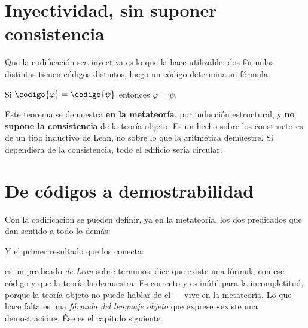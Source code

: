 \section{Inyectividad, sin suponer consistencia}

Que la codificación sea inyectiva es lo que la hace utilizable: dos fórmulas distintas tienen
códigos distintos, luego un código determina su fórmula.

\begin{teorema}
Si \(\codigo{\varphi} = \codigo{\psi}\) entonces \(\varphi = \psi\).
\end{teorema}


\begin{leccion}
Este teorema se demuestra \textbf{en la metateoría}, por inducción estructural, y \textbf{no supone
la consistencia} de la teoría objeto. Es un hecho sobre los constructores de un tipo inductivo de
Lean, no sobre lo que la aritmética demuestre. Si dependiera de la consistencia, todo el edificio
sería circular.
\end{leccion}

\section{De códigos a demostrabilidad}

Con la codificación se pueden definir, ya en la metateoría, los dos predicados que dan sentido a
todo lo demás:


\noindent Y el primer resultado que los conecta:


\begin{muro}
 es un predicado \emph{de Lean} sobre términos: dice que existe una fórmula con ese
código y que la teoría la demuestra. Es correcto y es inútil para la incompletitud, porque la
teoría objeto no puede hablar de él — vive en la metateoría. Lo que hace falta es una \emph{fórmula
del lenguaje objeto} que exprese «existe una demostración». Ése es el capítulo siguiente.
\end{muro}
